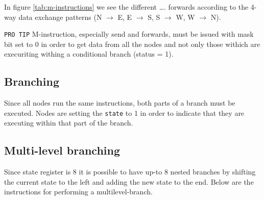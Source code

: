 

In figure \ref{tab:m-instructions} we see the different \ldots.   forwards according to the 4-way data exchange patterns (N
$\rightarrow$ E, E $\rightarrow$ S, S $\rightarrow$ W, W $\rightarrow$ N).

{\tt PRO TIP} 
M-instruction, especially send and forwards, must be issued with mask bit set to
0 in order to get data from all the nodes and not only those withich are
execuriting withing a conditional branch (status = 1).



\subsection{Branching}
Since all nodes run the same instructions, both parts of a branch must be
executed. Nodes are setting the {\tt state} to 1 in order to indicate that they
are executing within that part of the branch.



\subsection{Multi-level branching}
Since state register is 8 it is possible to have up-to 8 nested branches by
shifting the current state to the left and adding the new state to the
end. Below  are the
instructions for performing a multilevel-branch.


